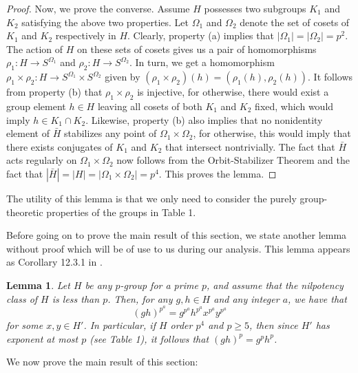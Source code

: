 \documentclass[12pt]{amsart}
\newtheorem{lemma}[theorem]{Lemma}
\theoremstyle{definition}
\begin{document}
\begin{proof}
	Now, we prove the converse. Assume $H$ possesses two subgroups $K_1$ and $K_2$ satisfying the above two properties. Let $\Omega_1$ and $\Omega_2$ denote the set of cosets of $K_1$ and $K_2$ respectively in $H$. Clearly, property (a) implies that $|\Omega_1| = |\Omega_2| = p^2$. The action of $H$ on these sets of cosets gives us a pair of homomorphisms $\rho_1: H \to S^{\Omega_1}$ and $\rho_2: H \to S^{\Omega_2}$. In turn, we get a homomorphism $\rho_1 \times \rho_2: H \to S^{\Omega_1} \times S^{\Omega_2}$ given by $(\rho_1 \times \rho_2)(h) = (\rho_1(h),\rho_2(h))$. It follows from property (b) that $\rho_1 \times \rho_2$ is injective, for otherwise, there would exist a group element $h \in H$ leaving all cosets of both $K_1$ and $K_2$ fixed, which would imply $h \in K_1 \cap K_2$. Likewise, property (b) also implies that no nonidentity element of $\bar{H}$ stabilizes any point of $\Omega_1 \times \Omega_2$, for otherwise, this would imply that there exists conjugates of $K_1$ and $K_2$ that intersect nontrivially. The fact that $\bar{H}$ acts regularly on $\Omega_1 \times \Omega_2$ now follows from the Orbit-Stabilizer Theorem and the fact that $|\bar{H}| = |H| = |\Omega_1 \times \Omega_2| = p^4$. This proves the lemma.
\end{proof}
	
The utility of this lemma is that we only need to consider the purely group-theoretic properties of the groups in Table 1.

Before going on to prove the main result of this section, we state another lemma without proof which will be of use to us during our analysis. This lemma appears as Corollary 12.3.1 in \cite{Hall}.

\begin{lemma}\label{hall-pet}
	Let $H$ be any $p$-group for a prime $p$, and assume that the nilpotency class of $H$ is less than $p$. Then, for any $g,h \in H$ and any integer $a$, we have that
	$$
	(gh)^{p^a} = g^{p^a}h^{p^a}x^{p^a}y^{p^a}
	$$
	for some $x,y \in H'$. In particular, if $H$ order $p^4$ and $p \geq 5$, then since $H'$ has exponent at most $p$ (see Table 1), it follows that $(gh)^p = g^ph^p$.
\end{lemma}

We now prove the main result of this section:
\end{document}
